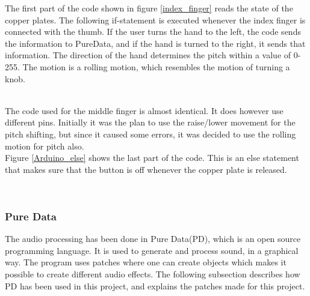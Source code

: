 The first part of the code shown in figure \ref{index_finger} reads the state of the copper plates. The following if-statement is executed whenever the index finger is connected with the thumb. 
If the user turns the hand to the left, the code sends the information to PureData, and if the hand is turned to the right, it sends that information. 
The direction of the hand determines the pitch within a value of 0-255. The motion is a rolling motion, which resembles the motion of turning a knob. \\


\begin{minipage}{\linewidth}%
\label{index_finger}
\end{minipage}\\

The code used for the middle finger is almost identical. It does however use different pins. Initially it was the plan to use the raise/lower movement for the pitch shifting, but since it caused some errors, it was decided to use the rolling motion for pitch also.\\

Figure \ref{Arduino_else} shows the last part of the code. This is an else statement that makes sure that the button is off whenever the copper plate is released. 

\begin{minipage}{\linewidth}%
\label{Arduino_else}
\end{minipage}\\


\subsubsection{Pure Data}

The audio processing has been done in Pure Data(PD)\citep{PD_Info}, which is an open source programming language. It is used to generate and process sound, in a graphical way. 
The program uses patches where one can create objects which makes it possible to create different audio effects. The following subsection describes how PD has been used in this project, and explains the patches made for this project. \\

